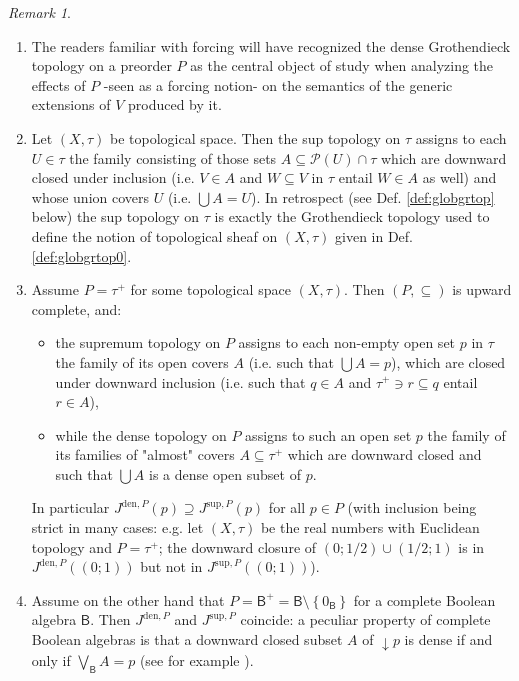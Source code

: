 \documentclass[11pt]{amsart}
\theoremstyle{plain}
\theoremstyle{definition}
\theoremstyle{plain}
\theoremstyle{remark}
\newtheorem{remark}[theorem]{Remark}
\newcommand{\bool}[1]{\mathsf{#1}}
\newcommand{\pow}[1]{\mathcal{P}\left(#1\right)}
\newcommand{\bp}[1]{\left\lbrace #1 \right\rbrace}
\newcommand{\0}{\mathsf{0}}
\renewcommand{\1}{\mathsf{1}}
\renewcommand{\2}{\mathsf{2}}
\theoremstyle{definition}
\begin{document}
\begin{remark}
\emph{}

\begin{enumerate}
\item The readers familiar with forcing will have recognized the dense Grothendieck topology on a preorder $P$ as the central object of study when analyzing the effects of $P$ -seen as a forcing notion- on the semantics of the generic extensions of $V$ produced by it.
\item Let $(X,\tau)$ be  topological space. Then the sup topology on $\tau$ assigns to each $U\in\tau$ the family consisting of those sets $A\subseteq \pow{U}\cap\tau$ which are downward closed under inclusion (i.e. $V\in A$ and $W\subseteq V$ in $\tau$ entail $W\in A$ as well) and whose union covers $U$ (i.e. $\bigcup A=U$). In retrospect (see Def. \ref{def:globgrtop} below) the sup topology on $\tau$ is exactly the Grothendieck topology  used to define the notion of topological sheaf on $(X,\tau)$ given in Def. \ref{def:globgrtop0}.
\item
Assume $P=\tau^+$ for some topological space $(X,\tau)$. 
Then $(P,\subseteq)$ is upward complete, and:
\begin{itemize} 
\item
the supremum topology on $P$ assigns to each non-empty open set $p$ in $\tau$ the family of its open covers $A$ (i.e. such that $\bigcup A=p$), which are closed under downward inclusion (i.e. such that $q\in A$ and 
$\tau^+\ni r\subseteq q$ entail $r\in A$),
\item
while the dense topology on $P$ assigns to such an open set $p$ the family of its families
of "almost" covers $A\subseteq \tau^+$ which are downward closed and such that $\bigcup A$ is a dense open subset of $p$.
\end{itemize} 
In particular $J^{\mathrm{den},P}(p)\supseteq J^{\mathrm{sup},P}(p)$ for all $p\in P$ (with inclusion being strict in many cases: e.g. let $(X,\tau)$ be the real numbers with Euclidean topology and $P=\tau^+$; the downward closure of $(0;1/2)\cup(1/2;1)$ is in $J^{\mathrm{den},P}((0;1))$ but not in $J^{\mathrm{sup},P}((0;1))$).

\item
Assume on the other hand that $P=\bool{B}^+=\bool{B}\setminus\bp{0_\bool{B}}$ for  a complete Boolean algebra $\bool{B}$. Then $J^{\mathrm{den},P}$ and 
$J^{\mathrm{sup},P}$ coincide: a peculiar property of complete Boolean algebras is that a downward closed subset $A$ of $\downarrow p$ is dense if and only if $\bigvee_\bool{B} A=p$ (see for example \cite[Fact 3.11.7]{viale-bookonforcing}).  


\end{enumerate}
\end{remark}
\end{document}
